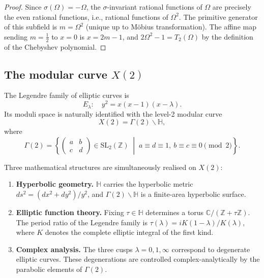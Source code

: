 \documentclass[12pt]{article}
\theoremstyle{plain}
\theoremstyle{definition}
\numberwithin{equation}{section}
\newcommand{\C}{\mathbb{C}}
\newcommand{\Z}{\mathbb{Z}}
\newcommand{\HH}{\mathbb{H}}
\begin{document}
\begin{proof}
Since $\sigma(\Omega)=-\Omega$, the $\sigma$-invariant rational functions of $\Omega$ are precisely the even rational functions, i.e., rational functions of $\Omega^2$.  The primitive generator of this subfield is $m=\Omega^2$ (unique up to M\"obius transformation).  The affine map sending $m=\frac{1}{2}$ to $x=0$ is $x=2m-1$, and $2\Omega^2-1=T_2(\Omega)$ by the definition of the Chebyshev polynomial.
\end{proof}

\subsection{The modular curve $X(2)$}

The Legendre family of elliptic curves is
\begin{equation}
E_\lambda:\quad y^2 = x(x-1)(x-\lambda).
\end{equation}
Its moduli space is naturally identified with the level-2 modular curve
\begin{equation}
X(2) = \Gamma(2)\backslash\HH,
\end{equation}
where
\begin{equation}
\Gamma(2) = \left\{
\begin{pmatrix} a & b \\ c & d \end{pmatrix} \in \mathrm{SL}_2(\Z)
\;\middle|\;
a\equiv d\equiv 1,\ b\equiv c\equiv 0 \pmod{2}
\right\}.
\end{equation}

Three mathematical structures are simultaneously realised on $X(2)$:

\begin{enumerate}[label=(\roman*)]
\item \textbf{Hyperbolic geometry.}  $\HH$ carries the hyperbolic metric $ds^2=(dx^2+dy^2)/y^2$, and $\Gamma(2)\backslash\HH$ is a finite-area hyperbolic surface.

\item \textbf{Elliptic function theory.}  Fixing $\tau\in\HH$ determines a torus $\C/(\Z+\tau\Z)$.  The period ratio of the Legendre family is $\tau(\lambda)=iK(1-\lambda)/K(\lambda)$, where $K$ denotes the complete elliptic integral of the first kind.

\item \textbf{Complex analysis.}  The three cusps $\lambda=0,1,\infty$ correspond to degenerate elliptic curves.  These degenerations are controlled complex-analytically by the parabolic elements of $\Gamma(2)$.
\end{enumerate}
\end{document}
